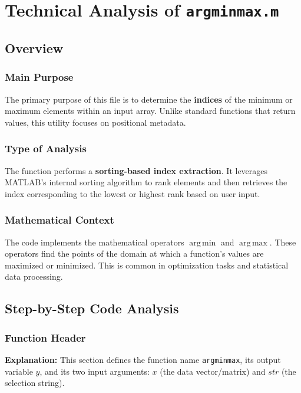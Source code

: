 
\chapter{Technical Analysis of \texttt{argminmax.m}}
\author{Software Engineering Analysis}
\date{\today}

\maketitle

\section{Overview}

\subsection{Main Purpose}
The primary purpose of this file is to determine the \textbf{indices} of the minimum or maximum elements within an input array. Unlike standard functions that return values, this utility focuses on positional metadata.

\subsection{Type of Analysis}
The function performs a \textbf{sorting-based index extraction}. It leverages MATLAB's internal sorting algorithm to rank elements and then retrieves the index corresponding to the lowest or highest rank based on user input.

\subsection{Mathematical Context}
The code implements the mathematical operators $\operatorname{arg\,min}$ and $\operatorname{arg\,max}$. These operators find the points of the domain at which a function's values are maximized or minimized. This is common in optimization tasks and statistical data processing.

\section{Step-by-Step Code Analysis}

\subsection{Function Header}
\textbf{Explanation:} This section defines the function name \texttt{argminmax}, its output variable $y$, and its two input arguments: $x$ (the data vector/matrix) and $str$ (the selection string).

